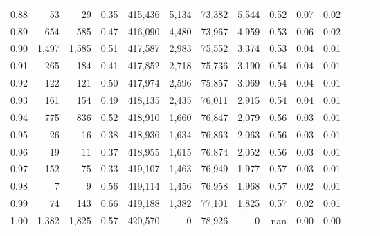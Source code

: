 \begin{tabular}{rrrrrrrrrrrrrr}
0.88 &      53 &     29 &  0.35 &  415,436 &    5,134 &  73,382 &   5,544 &  0.52 &  0.07 &      0.02 \\
0.89 &     654 &    585 &  0.47 &  416,090 &    4,480 &  73,967 &   4,959 &  0.53 &  0.06 &      0.02 \\
0.90 &   1,497 &  1,585 &  0.51 &  417,587 &    2,983 &  75,552 &   3,374 &  0.53 &  0.04 &      0.01 \\
0.91 &     265 &    184 &  0.41 &  417,852 &    2,718 &  75,736 &   3,190 &  0.54 &  0.04 &      0.01 \\
0.92 &     122 &    121 &  0.50 &  417,974 &    2,596 &  75,857 &   3,069 &  0.54 &  0.04 &      0.01 \\
0.93 &     161 &    154 &  0.49 &  418,135 &    2,435 &  76,011 &   2,915 &  0.54 &  0.04 &      0.01 \\
0.94 &     775 &    836 &  0.52 &  418,910 &    1,660 &  76,847 &   2,079 &  0.56 &  0.03 &      0.01 \\
0.95 &      26 &     16 &  0.38 &  418,936 &    1,634 &  76,863 &   2,063 &  0.56 &  0.03 &      0.01 \\
0.96 &      19 &     11 &  0.37 &  418,955 &    1,615 &  76,874 &   2,052 &  0.56 &  0.03 &      0.01 \\
0.97 &     152 &     75 &  0.33 &  419,107 &    1,463 &  76,949 &   1,977 &  0.57 &  0.03 &      0.01 \\
0.98 &       7 &      9 &  0.56 &  419,114 &    1,456 &  76,958 &   1,968 &  0.57 &  0.02 &      0.01 \\
0.99 &      74 &    143 &  0.66 &  419,188 &    1,382 &  77,101 &   1,825 &  0.57 &  0.02 &      0.01 \\
1.00 &   1,382 &  1,825 &  0.57 &  420,570 &        0 &  78,926 &       0 &   nan &  0.00 &      0.00 \\
\bottomrule
\end{tabular}

